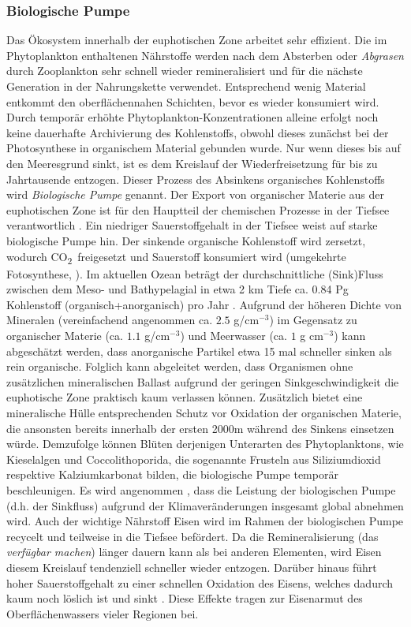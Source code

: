 \documentclass[12pt,a4paper,onecolumn,headheight=30pt]{scrartcl}
\newcommand{\cotwo}{CO\textsubscript{2}}
\begin{document}
\subsubsection{Biologische Pumpe} \label{sec:biopump}
Das Ökosystem innerhalb der euphotischen Zone arbeitet sehr effizient. Die im Phytoplankton enthaltenen Nährstoffe werden nach dem Absterben oder \textit{Abgrasen} durch Zooplankton sehr schnell wieder remineralisiert und für die nächste Generation in der Nahrungskette verwendet. Entsprechend wenig Material entkommt den oberflächennahen Schichten, bevor es wieder konsumiert wird. Durch temporär erhöhte Phytoplankton-Konzentrationen alleine erfolgt noch keine dauerhafte Archivierung des Kohlenstoffs, obwohl dieses zunächst bei der Photosynthese in organischem Material gebunden wurde. Nur wenn dieses bis auf den Meeresgrund sinkt, ist es dem Kreislauf der Wiederfreisetzung für bis zu Jahrtausende entzogen. Dieser Prozess des Absinkens organisches Kohlenstoffs wird \textit{Biologische Pumpe} genannt. Der Export von organischer Materie aus der euphotischen Zone ist für den Hauptteil der chemischen Prozesse in der Tiefsee verantwortlich \citep{Emerson.2009}. Ein niedriger Sauerstoffgehalt in der Tiefsee weist auf starke biologische Pumpe hin. Der sinkende organische Kohlenstoff wird zersetzt, wodurch \cotwo \ freigesetzt und Sauerstoff konsumiert wird (umgekehrte Fotosynthese, \cite{Honjo.2008}). Im aktuellen Ozean beträgt der durchschnittliche (Sink)Fluss zwischen dem Meso- und Bathypelagial in etwa 2 km Tiefe ca. 0.84 Pg Kohlenstoff (organisch+anorganisch) pro Jahr \citep{Honjo.2008}. Aufgrund der höheren Dichte von Mineralen (vereinfachend angenommen ca. $2.5$ g/cm$^{-3}$) im Gegensatz zu organischer Materie (ca. $1.1$ g/cm$^{-3}$) und Meerwasser (ca. $1$ g cm$^{-3}$) kann abgeschätzt werden, dass anorganische Partikel etwa 15 mal schneller sinken als rein organische. Folglich kann abgeleitet werden, dass Organismen ohne zusätzlichen mineralischen Ballast aufgrund der geringen Sinkgeschwindigkeit die euphotische Zone praktisch kaum verlassen können. Zusätzlich bietet eine mineralische Hülle entsprechenden Schutz vor Oxidation der organischen Materie, die ansonsten bereits innerhalb der ersten 2000m während des Sinkens einsetzen würde\citep{Emerson.2009}. Demzufolge können Blüten derjenigen Unterarten des Phytoplanktons, wie Kieselalgen und Coccolithoporida, die sogenannte Frusteln aus Siliziumdioxid respektive Kalziumkarbonat bilden, die biologische Pumpe temporär beschleunigen. Es wird angenommen , dass die Leistung der biologischen Pumpe (d.h. der Sinkfluss) aufgrund der Klimaveränderungen insgesamt global abnehmen wird. Auch der wichtige Nährstoff Eisen wird im Rahmen der biologischen Pumpe recycelt und teilweise in die Tiefsee befördert. Da die Remineralisierung (das \textit{verfügbar machen}) länger dauern kann als bei anderen Elementen, wird Eisen diesem Kreislauf tendenziell schneller wieder entzogen. Darüber hinaus führt hoher Sauerstoffgehalt zu einer schnellen Oxidation des Eisens, welches dadurch kaum noch löslich ist und sinkt \citep{Falkowski.1998}. Diese  Effekte tragen zur Eisenarmut des Oberflächenwassers vieler Regionen bei.
\end{document}
